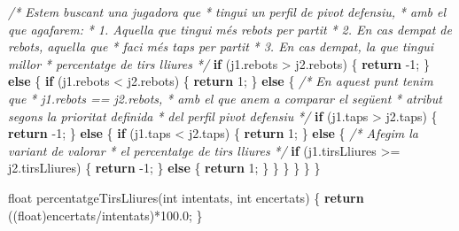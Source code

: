 \documentclass[]{book}
\newenvironment{Shaded}{\begin{snugshade}}{\end{snugshade}}
\newcommand{\CommentTok}[1]{\textcolor[rgb]{0.56,0.35,0.01}{\textit{#1}}}
\newcommand{\ControlFlowTok}[1]{\textcolor[rgb]{0.13,0.29,0.53}{\textbf{#1}}}
\newcommand{\DataTypeTok}[1]{\textcolor[rgb]{0.13,0.29,0.53}{#1}}
\newcommand{\DecValTok}[1]{\textcolor[rgb]{0.00,0.00,0.81}{#1}}
\newcommand{\FloatTok}[1]{\textcolor[rgb]{0.00,0.00,0.81}{#1}}
\newcommand{\NormalTok}[1]{#1}
\begin{document}
\begin{Shaded}
\begin{Highlighting}[]
    \CommentTok{/* Estem buscant una jugadora que }
\CommentTok{     * tingui un perfil de pivot defensiu, }
\CommentTok{     * amb el que agafarem:}
\CommentTok{     * 1. Aquella que tingui més rebots per partit}
\CommentTok{     * 2. En cas d\textquotesingle{}empat de rebots, aquella que}
\CommentTok{     *    faci més taps per partit}
\CommentTok{     * 3. En cas d\textquotesingle{}empat, la que tingui millor}
\CommentTok{     *    percentatge de tirs lliures}
\CommentTok{     */} 
    \ControlFlowTok{if}\NormalTok{ (j1.rebots \textgreater{} j2.rebots) \{}
        \ControlFlowTok{return}\NormalTok{ {-}}\DecValTok{1}\NormalTok{;}
\NormalTok{    \} }\ControlFlowTok{else}\NormalTok{ \{}
        \ControlFlowTok{if}\NormalTok{ (j1.rebots \textless{} j2.rebots) \{}
            \ControlFlowTok{return} \DecValTok{1}\NormalTok{;}
\NormalTok{        \} }\ControlFlowTok{else}\NormalTok{ \{}
            \CommentTok{/* En aquest punt tenim que }
\CommentTok{             * j1.rebots == j2.rebots,}
\CommentTok{             * amb el que anem a comparar el següent}
\CommentTok{             * atribut segons la prioritat definida}
\CommentTok{             * del perfil pivot defensiu}
\CommentTok{             */}
            \ControlFlowTok{if}\NormalTok{ (j1.taps \textgreater{} j2.taps) \{}
                \ControlFlowTok{return}\NormalTok{ {-}}\DecValTok{1}\NormalTok{;}
\NormalTok{            \} }\ControlFlowTok{else}\NormalTok{ \{}
                \ControlFlowTok{if}\NormalTok{ (j1.taps \textless{} j2.taps) \{}
                    \ControlFlowTok{return} \DecValTok{1}\NormalTok{;}
\NormalTok{                \} }\ControlFlowTok{else}\NormalTok{ \{}
                    \CommentTok{/* Afegim la variant de valorar}
\CommentTok{                     * el percentatge de tirs lliures}
\CommentTok{                     */}
                    \ControlFlowTok{if}\NormalTok{ (j1.tirsLliures \textgreater{}= j2.tirsLliures) \{}
                        \ControlFlowTok{return}\NormalTok{ {-}}\DecValTok{1}\NormalTok{;}
\NormalTok{                    \} }\ControlFlowTok{else}\NormalTok{ \{}
                        \ControlFlowTok{return} \DecValTok{1}\NormalTok{;}
\NormalTok{                    \}}
\NormalTok{                \}}
\NormalTok{            \}}
\NormalTok{        \}}
\NormalTok{    \}}
\NormalTok{\}}

\DataTypeTok{float}\NormalTok{ percentatgeTirsLliures(}\DataTypeTok{int}\NormalTok{ intentats, }\DataTypeTok{int}\NormalTok{ encertats) \{}
    \ControlFlowTok{return}\NormalTok{ ((}\DataTypeTok{float}\NormalTok{)encertats/intentats)*}\FloatTok{100.0}\NormalTok{;}
\NormalTok{\}}
\end{Highlighting}
\end{Shaded}
\end{document}
